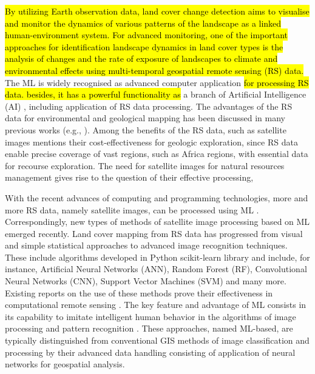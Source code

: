 \documentclass[12pt,a4paper,oneside]{article}
\def \newpar{\vspace{6pt}}
\begin{document}
\newpar \hl{By utilizing Earth observation data, land cover change detection aims to visualise and monitor the dynamics of various patterns of the landscape as a linked human-environment system. For advanced monitoring, one of the important approaches for identification landscape dynamics in land cover types is the analysis of changes and the rate of exposure of landscapes to climate and environmental effects using multi-temporal geospatial remote sensing (RS) data. }The ML is widely recognised as advanced computer application \hl{for processing RS data. besides, it has a powerful functionality as }a branch of Artificial Intelligence (AI)\hl{ }\citep{YANG2024102087,RATHORE2016122,LEMENKOVA2025100180,CEDRIC2022100049}, including application of RS data processing. The advantages of the RS data for environmental and geological mapping has been discussed in many previous works (e.g., \citep{Parajuli,Niang2022,Ashpole}). Among the benefits of the RS data, such as satellite images \citep{GRANDJEAN2006220} mentions their cost-effectiveness for geologic exploration, since\hl{ }RS data enable precise coverage of vast regions, such as Africa regions, with essential data for recourse exploration. The need for satellite images for natural resources management gives rise to the question of their effective processing,

\newpar With the recent advances of computing and programming technologies, more and more RS data, namely satellite images, can be processed using ML \citep{BELMAHDI2023100906,Lemenkova202021,GOMEZ201929}. Correspondingly, new types of methods of satellite image processing based on ML emerged recently. Land cover mapping from RS data has progressed from visual and simple statistical approaches to advanced image recognition techniques. These include algorithms developed in Python scikit-learn library and include, for instance, Artificial Neural Networks (ANN), Random Forest (RF), Convolutional Neural Networks (CNN), Support Vector Machines (SVM) and many more. Existing reports on the use of these methods prove their effectiveness in computational remote sensing  \citep{Lemenkova202411,GAWUSU2024100065,Lemenkova202410,NENKAM2024117007}. The key feature and advantage of ML consists in its capability to imitate intelligent human behavior in the algorithms of image processing and pattern recognition \citep{EBRAHIMY2023103390,PANDE2024141035,Lemenkova202217}. These approaches, named ML-based, are typically distinguished from conventional GIS methods of image classification and processing by their advanced data handling consisting of application of neural networks for geospatial analysis. 
\end{document}
